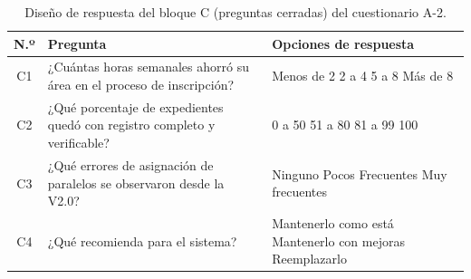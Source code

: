 \begin{table}[htbp]
    \centering
    \caption{Diseño de respuesta del bloque C (preguntas cerradas) del cuestionario A-2.}
    \label{tab:a2_cerradas}
    \begin{tabularx}{\textwidth}{c L L}
        \toprule
        \textbf{N.º} & \textbf{Pregunta} & \textbf{Opciones de respuesta} \\
        \midrule
        C1 & ¿Cuántas horas semanales ahorró su área en el proceso de inscripción? & \casilla{} Menos de 2 \quad \casilla{} 2 a 4 \quad \casilla{} 5 a 8 \quad \casilla{} Más de 8 \\
        C2 & ¿Qué porcentaje de expedientes quedó con registro completo y verificable? & \casilla{} 0 a 50 \quad \casilla{} 51 a 80 \quad \casilla{} 81 a 99 \quad \casilla{} 100 \\
        C3 & ¿Qué errores de asignación de paralelos se observaron desde la V2.0? & \casilla{} Ninguno \quad \casilla{} Pocos \quad \casilla{} Frecuentes \quad \casilla{} Muy frecuentes \\
        C4 & ¿Qué recomienda para el sistema? & \casilla{} Mantenerlo como está \quad \casilla{} Mantenerlo con mejoras \quad \casilla{} Reemplazarlo \\
        \bottomrule
    \end{tabularx}
\end{table}

